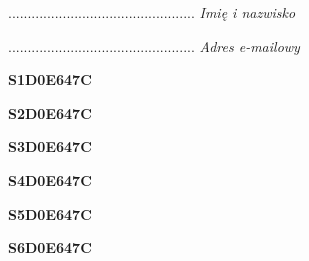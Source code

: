 \begin{turn}{90}\begin{minipage}{\linewidth} \vspace{20mm} ................................................  \textit{Imię i nazwisko}\end{minipage}\end{turn}

\begin{turn}{90}\begin{minipage}{\linewidth} \vspace{20mm} ................................................  \textit{Adres e-mailowy}\end{minipage}\end{turn}

\begin{turn}{90}\huge \begin{minipage}{\linewidth} \vspace{10mm}\textbf{S1D0E647C}\end{minipage}\end{turn}

\begin{turn}{90}\huge \begin{minipage}{\linewidth} \vspace{10mm}\textbf{S2D0E647C}\end{minipage}\end{turn}

\begin{turn}{90}\huge \begin{minipage}{\linewidth} \vspace{10mm}\textbf{S3D0E647C}\end{minipage}\end{turn}

\begin{turn}{90}\huge \begin{minipage}{\linewidth} \vspace{10mm}\textbf{S4D0E647C}\end{minipage}\end{turn}

\begin{turn}{90}\huge \begin{minipage}{\linewidth} \vspace{10mm}\textbf{S5D0E647C}\end{minipage}\end{turn}

\begin{turn}{90}\huge \begin{minipage}{\linewidth} \vspace{10mm}\textbf{S6D0E647C}\end{minipage}\end{turn}

